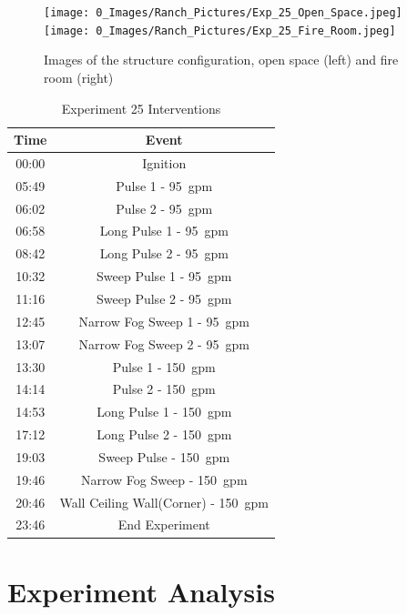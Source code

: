 \documentclass[12pt,oneside]{book}
\begin{document}
\begin{figure}[H]
\centering
\texttt{[image: 0\_Images/Ranch\_Pictures/Exp\_25\_Open\_Space.jpeg]}
\texttt{[image: 0\_Images/Ranch\_Pictures/Exp\_25\_Fire\_Room.jpeg]}
\caption{Images of the structure configuration, open space (left) and fire room (right)}
\label{fig:Exp_25_Images}
\end{figure}


\begin{table}[H]
	\centering
	\caption{Experiment 25 Interventions}
	\begin{tabular}{|c|c|} 
		\hline
		Time & 	Event \\ \hline \hline
		00:00 &	Ignition \\ \hline
		05:49 &	Pulse 1 - 95~gpm \\ \hline
		06:02 &	Pulse 2 -  95~gpm \\ \hline
		06:58 &	Long Pulse 1 - 95~gpm \\ \hline
		08:42 &	Long Pulse 2 - 95~gpm \\ \hline
		10:32 &	Sweep Pulse 1 - 95~gpm \\ \hline
		11:16 &	Sweep Pulse 2 - 95~gpm \\ \hline
		12:45 &	Narrow Fog Sweep 1 - 95~gpm \\ \hline
		13:07 &	Narrow Fog Sweep 2 - 95~gpm \\ \hline
		13:30 &	Pulse 1 - 150~gpm \\ \hline
		14:14 &	Pulse 2 - 150~gpm \\ \hline
		14:53 &	Long Pulse 1 - 150~gpm \\ \hline
		17:12 &	Long Pulse 2 - 150~gpm \\ \hline
		19:03 &	Sweep Pulse  - 150~gpm \\ \hline
		19:46 &	Narrow Fog Sweep  - 150~gpm \\ \hline
		20:46 &	Wall Ceiling Wall(Corner) - 150~gpm \\ \hline
		23:46 &	End Experiment \\ \hline
	\end{tabular}
	\label{Table:Exp25Interventions}
\end{table}

\chapter{Experiment Analysis}
\end{document}
